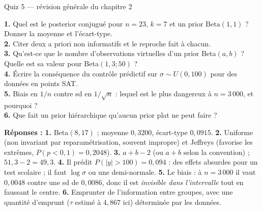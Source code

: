 \begin{frame}{Quiz 5 — révision générale du chapitre 2}
\begin{qbox}
\textbf{1.} Quel est le posterior conjugué pour $n = 23$, $k = 7$ et un prior
$\mathrm{Beta}(1,1)$ ? Donner la moyenne et l'écart-type. \\[1mm]
\textbf{2.} Citer deux a priori non informatifs et le reproche fait à chacun. \\[1mm]
\textbf{3.} Qu'est-ce que le nombre d'observations virtuelles d'un prior
Beta$(a,b)$ ? Quelle est sa valeur pour Beta$(1{,}3;50)$ ? \\[1mm]
\textbf{4.} Écrire la conséquence du contrôle prédictif sur
$\sigma \sim U(0,100)$ pour des données en points SAT. \\[1mm]
\textbf{5.} Biais en $1/n$ contre sd en $1/\sqrt{n}$ : lequel est le plus dangereux
à $n = 3\,000$, et pourquoi ? \\[1mm]
\textbf{6.} Que fait un prior hiérarchique qu'aucun prior plat ne peut faire ?
\vspace{1.5mm}

\textcolor{byBlue}{\textbf{Réponses :}}
\textbf{1.} Beta$(8,17)$ ; moyenne $0{,}3200$, écart-type $0{,}0915$.
\quad
\textbf{2.} Uniforme (non invariant par reparamétrisation, souvent impropre) et
Jeffreys (favorise les extrêmes, $P(p<0{,}1) = 0{,}2048$).
\quad
\textbf{3.} $a+b-2$ (ou $a+b$ selon la convention) ; $51{,}3 - 2 = 49{,}3$.
\quad
\textbf{4.} Il prédit $P(|y|>100) = 0{,}094$ : des effets absurdes pour un test
scolaire ; il faut $\log\sigma$ ou une demi-normale.
\quad
\textbf{5.} Le biais : à $n = 3\,000$ il vaut $0{,}0048$ contre une sd de
$0{,}0086$, donc il est \emph{invisible dans l'intervalle} tout en faussant le centre.
\quad
\textbf{6.} Emprunter de l'information entre groupes, avec une quantité
d'emprunt ($\tau$ estimé à $4{,}867$ ici) déterminée par les données.
\end{qbox}
\end{frame}

